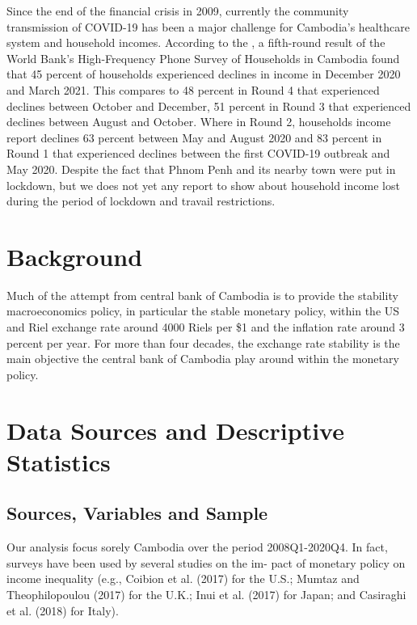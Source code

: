 \documentclass[11pt,letterpaper]{article}
\begin{document}
Since the end of the financial crisis in 2009, currently the community transmission of COVID-19 has been a major challenge for Cambodia's healthcare system and household incomes. According to the \cite{Karamba2021}, a fifth-round result of the World Bank's High-Frequency Phone Survey of Households in Cambodia found that 45 percent of households experienced declines in income in December 2020 and March 2021. This compares to 48 percent in Round 4 that experienced declines between October and December, 51 percent in Round 3 that experienced declines between August and October. Where in Round 2, households income report declines 63 percent between May and August 2020 and 83 percent in Round 1 that experienced declines between the first COVID-19 outbreak and May 2020. Despite the fact that Phnom Penh and its nearby town were put in lockdown, but we does not yet any report to show about household income lost during the period of lockdown and travail restrictions.  

\section{Background}\label{sec:back}
Much of the attempt from  central bank of Cambodia is to provide the stability macroeconomics policy, in particular the stable monetary policy, within the US and Riel exchange rate around 4000 Riels per \$1 and the inflation rate around 3 percent per year. For more than four decades, the exchange rate stability is the main objective the central bank of Cambodia play around within the monetary policy.  
\section{Data Sources and Descriptive Statistics}\label{sec:data}
\subsection{Sources, Variables and Sample}	
Our analysis focus sorely Cambodia over the period 2008Q1-2020Q4. In fact, surveys have been used by several studies on the im- pact of monetary policy on income inequality (e.g., Coibion et al. (2017) for the U.S.; Mumtaz and Theophilopoulou (2017) for the U.K.; Inui et al. (2017) for Japan; and Casiraghi et al. (2018) for Italy).
\end{document}
